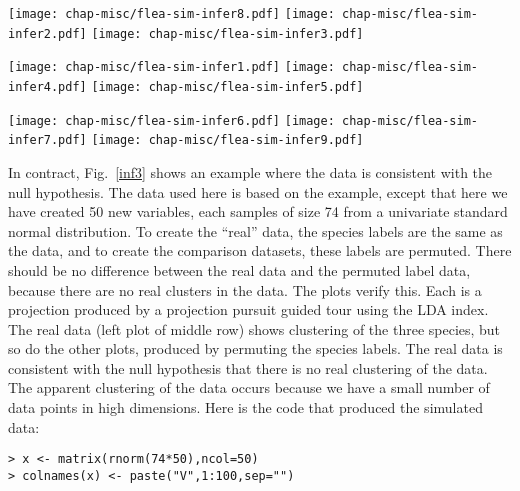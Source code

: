 \begin{figure*}[htp]
\centerline{{\texttt{[image: chap-misc/flea-sim-infer8.pdf]}}
  {\texttt{[image: chap-misc/flea-sim-infer2.pdf]}}
  {\texttt{[image: chap-misc/flea-sim-infer3.pdf]}}}
\centerline{{\texttt{[image: chap-misc/flea-sim-infer1.pdf]}}
  {\texttt{[image: chap-misc/flea-sim-infer4.pdf]}}
  {\texttt{[image: chap-misc/flea-sim-infer5.pdf]}}}
\centerline{{\texttt{[image: chap-misc/flea-sim-infer6.pdf]}}
  {\texttt{[image: chap-misc/flea-sim-infer7.pdf]}}
  {\texttt{[image: chap-misc/flea-sim-infer9.pdf]}}}
\caption[Testing the assumption that species labels correspond to
groups in simulated data]{Testing the assumption that species labels
correspond to three groups in simulated data, using a projection
pursuit guided tour with the LDA index. The data is similar to
 in that there are 74 cases, divided into three classes, 
but there are now 50 variables instead of 6. The plots show optional
projections of the same data, except that in eight of the nine plots,
the species labels have been permuted.  The plot of the real data
(left plot of the middle row) is not distinguishable from the others!}
\label{inf3}
\end{figure*}

In contract, Fig.~\ref{inf3} shows an example where the data is
consistent with the null hypothesis. The data used here is based on
the  example, except that here we have created 50 new
variables, each samples of size 74 from a univariate standard normal
distribution.  To create the ``real'' data, the species labels are the
same as the  data, and to create the comparison
datasets, these labels are permuted. There should be no difference
between the real data and the permuted label data, because there are
no real clusters in the data. The plots verify this. Each is a
projection produced by a projection pursuit guided tour using the LDA
index. The real data (left plot of middle row) shows clustering of the
three species, but so do the other plots, produced by permuting the
species labels. The real data is consistent with the null hypothesis
that there is no real clustering of the data. The apparent clustering
of the data occurs because we have a small number of data points in
high dimensions. Here is the code that produced the simulated data:

\begin{verbatim}
> x <- matrix(rnorm(74*50),ncol=50)
> colnames(x) <- paste("V",1:100,sep="")
\end{verbatim}

